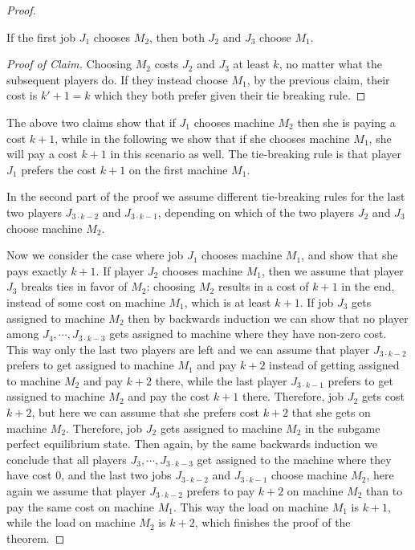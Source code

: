 \documentclass[runningheads]{llncs}
\newcommand{\pp}[1]{\todo[color=blue!40!white]{\scriptsize Pao: #1}}
\begin{document}
\begin{proof}
\begin{claim}
	If the first job $J_1$ chooses $M_2$, then both $J_2$ and $J_3$ choose $M_1$.
\end{claim}
\begin{proof}[Proof of Claim] 
	Choosing $M_2$ costs $J_2$ and $J_3$ at least $k$, no matter what the subsequent players do. If they instead choose $M_1$, by the previous claim, their cost is $k'+1=k$ which they both prefer given their tie breaking rule.
\end{proof}

%
%
%

The above two claims show that if $J_1$ chooses machine $M_2$ then she is paying a cost $k+1$, while in the following we show that if she chooses machine $M_1$, she will pay a cost $k+1$ in this scenario as well. The tie-breaking rule is that player $J_1$ prefers the cost $k+1$ on the first machine $M_1$.

In the second part of the proof we assume different tie-breaking rules for the last two players $J_{3\cdot k - 2}$ and $J_{3\cdot k - 1}$, depending on which of the two players $J_2$ and $J_3$ choose machine $M_2$.

Now we consider the case where job $J_1$ chooses machine $M_1$, and show that she pays exactly $k+1$.  If player $J_2$  chooses machine $M_1$, then we assume that  player $J_3$ breaks ties in favor of $M_2$: choosing  $M_2$ results in a cost of $k+1$ in the end, instead of some cost on machine $M_1$, which is at least $k+1$. If job $J_3$ gets assigned to machine $M_2$ then by backwards induction we can show that no player among $J_4,\cdots, J_{3\cdot k-3}$ gets assigned to machine where they have non-zero cost. This way only the last two players are left and we can assume that player $J_{3\cdot k-2}$ prefers to get assigned to machine $M_1$ and pay $k+2$ instead of getting assigned  to machine $M_2$ and pay $k+2$ there, while the last player $J_{3\cdot k-1}$ prefers to get assigned to machine $M_2$ and pay the cost $k+1$ there. Therefore, job $J_2$ gets cost $k+2$, but here we can assume that she prefers cost $k+2$ that she gets on machine $M_2$. Therefore, job $J_2$  gets assigned to machine $M_2$ in the subgame perfect equilibrium state. Then again, by the same backwards induction we conclude that all players $J_3,\cdots, J_{3\cdot k-3}$ get assigned to the machine where they have cost $0$, and the last two jobs $J_{3\cdot k-2}$ and $J_{3\cdot k-1}$ choose machine $M_2$, here again we assume that player $J_{3\cdot k-2}$ prefers to pay $k+2$ on machine $M_2$ than to pay the same cost on machine $M_1$. This way the load on machine $M_1$ is $k+1$, while the load on machine $M_2$ is $k+2$, which finishes the proof of the theorem.  

\end{proof}
\end{document}
